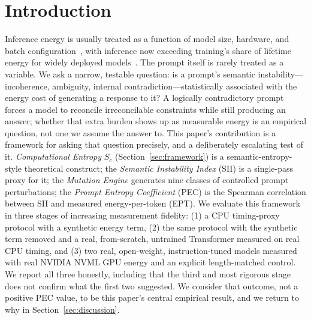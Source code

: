 \documentclass[conference]{IEEEtran}
\begin{document}
\section{Introduction}
Inference energy is usually treated as a function of model size,
hardware, and batch configuration~\cite{strubell2019energy,
patterson2022carbon,samsi2023words}, with inference now exceeding
training's share of lifetime energy for widely deployed
models~\cite{wu2022sustainable,faiz2024llmcarbon}. The prompt itself
is rarely treated as a variable. We ask a narrow, testable question:
is a prompt's semantic instability---incoherence, ambiguity, internal
contradiction---statistically associated with the energy cost of
generating a response to it? A logically contradictory prompt forces
a model to reconcile irreconcilable constraints while still producing
an answer; whether that extra burden shows up as measurable energy is
an empirical question, not one we assume the answer to.
This paper's contribution is a framework for asking that question
precisely, and a deliberately escalating test of it. \emph{Computational
Entropy} $S_c$ (Section~\ref{sec:framework}) is a semantic-entropy-style
theoretical construct; the \emph{Semantic Instability Index} (SII) is
a single-pass proxy for it; the \emph{Mutation Engine} generates nine
classes of controlled prompt perturbations; the \emph{Prompt Entropy
Coefficient} (PEC) is the Spearman correlation between SII and
measured energy-per-token (EPT). We evaluate this framework in three
stages of increasing measurement fidelity: (1) a CPU timing-proxy
protocol with a synthetic energy term, (2) the same protocol with the
synthetic term removed and a real, from-scratch, untrained Transformer
measured on real CPU timing, and (3) two real, open-weight,
instruction-tuned models measured with real NVIDIA NVML GPU energy and
an explicit length-matched control. We report all three honestly,
including that the third and most rigorous stage does not confirm
what the first two suggested. We consider that outcome, not a
positive PEC value, to be this paper's central empirical result, and
we return to why in Section~\ref{sec:discussion}.
\end{document}

